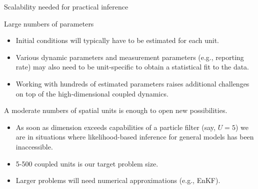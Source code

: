 \documentclass{beamer}
\begin{document}
\begin{frame}{Scalability needed for practical inference}

Large numbers of parameters
  \begin{itemize}
  \item  Initial conditions will typically have to be estimated for each unit.
  \item Various dynamic parameters and measurement parameters (e.g., reporting rate) may also need to be unit-specific to obtain a statistical fit to the data.
\item Working with hundreds of estimated parameters raises additional challenges on top of the high-dimensional coupled dynamics.
  \end{itemize}

\vspace{5mm}
  
A moderate numbers of spatial units is enough to open new possibilities.

  \begin{itemize}
  \item As soon as dimension exceeds capabilities of a particle filter (say, $U=5$) we are in situations where likelihood-based inference for general models has been inaccessible.

  \item 5-500 coupled units is our target problem size.

  \item Larger problems will need numerical approximations (e.g., EnKF).
        
  \end{itemize}

  \end{frame}
\end{document}
